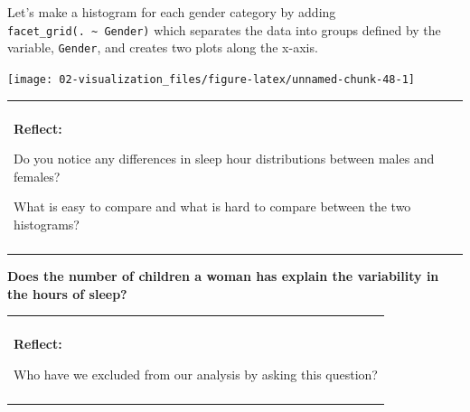 \documentclass[
]{book}
\newenvironment{Shaded}{\begin{snugshade}}{\end{snugshade}}
\newcommand{\DataTypeTok}[1]{\textcolor[rgb]{0.13,0.29,0.53}{#1}}
\newcommand{\DecValTok}[1]{\textcolor[rgb]{0.00,0.00,0.81}{#1}}
\newcommand{\KeywordTok}[1]{\textcolor[rgb]{0.13,0.29,0.53}{\textbf{#1}}}
\newcommand{\NormalTok}[1]{#1}
\newcommand{\OperatorTok}[1]{\textcolor[rgb]{0.81,0.36,0.00}{\textbf{#1}}}
\newcommand{\StringTok}[1]{\textcolor[rgb]{0.31,0.60,0.02}{#1}}
\newenvironment{reflect}
{
    \begin{center}
    
    \begin{tabular}{|p{0.8\textwidth}|}
    \rowcolor{LightBlue}
    \hline\\
    \rowcolor{LightBlue}
    \textbf{Reflect:}
}
{
    \\\rowcolor{LightBlue}
    \\\hline
    \end{tabular} 
    \end{center}
}
\begin{document}
Let's make a histogram for each gender category by adding \texttt{facet\_grid(.\ \textasciitilde{}\ Gender)} which separates the data into groups defined by the variable, \texttt{Gender}, and creates two plots along the x-axis.

\begin{Shaded}
\end{Shaded}

\begin{center}\texttt{[image: 02-visualization\_files/figure-latex/unnamed-chunk-48-1]} \end{center}

\begin{reflect}
Do you notice any differences in sleep hour distributions between males
and females?

What is easy to compare and what is hard to compare between the two
histograms?
\end{reflect}

\textbf{Does the number of children a woman has explain the variability in the hours of sleep?}

\begin{reflect}
Who have we excluded from our analysis by asking this question?
\end{reflect}
\end{document}
